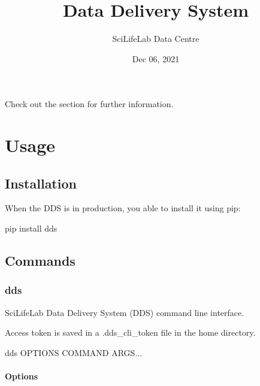 \documentclass[letterpaper,10pt,english]{sphinxmanual}
\title{Data Delivery System}
\date{Dec 06, 2021}
\author{SciLifeLab Data Centre}
\begin{document}
\pagestyle{empty}
\sphinxmaketitle
\pagestyle{plain}
\sphinxtableofcontents
\pagestyle{normal}
\label{\detokenize{index::doc}}


\sphinxAtStartPar
Check out the {\hyperref[\detokenize{usage::doc}]{}} section for further information.


\chapter{Usage}
\label{\detokenize{index:usage}}

\section{Installation}
\label{\detokenize{usage:installation}}\label{\detokenize{usage::doc}}
\sphinxAtStartPar
When the DDS is in production, you  able to install it using pip:

\begin{sphinxVerbatim}[commandchars=\\\{\}]
pip install dds
\end{sphinxVerbatim}


\section{Commands}
\label{\detokenize{usage:commands}}

\subsection{dds}
\label{\detokenize{usage:dds}}
\sphinxAtStartPar
SciLifeLab Data Delivery System (DDS) command line interface.

\sphinxAtStartPar
Access token is saved in a .dds\_cli\_token file in the home directory.

\begin{sphinxVerbatim}[commandchars=\\\{\}]
dds \PYG{o}{[}OPTIONS\PYG{o}{]} COMMAND \PYG{o}{[}ARGS\PYG{o}{]}...
\end{sphinxVerbatim}
\subsubsection*{Options}
\end{document}
